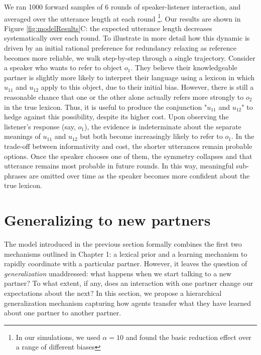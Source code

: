 We ran 1000 forward samples of 6 rounds of speaker-listener interaction, and averaged over the utterance length at each round \footnote{In our simulations, we used $\alpha = 10$ and found the basic reduction effect over a range of different biases}. 
Our results are shown in Figure \ref{fig:modelResults}C: the expected utterance length decreases systematically over each round. 
To illustrate in more detail how this dynamic is driven by an initial rational preference for redundancy relaxing as reference becomes more reliable, we walk step-by-step through a single trajectory. 
Consider a speaker who wants to refer to object $o_1$. 
They believe their knowledgeable partner is slightly more likely to interpret their language using a lexicon in which $u_{11}$ and $u_{12}$ apply to this object, due to their initial bias. 
However, there is still a reasonable chance that one or the other alone actually refers more strongly to $o_2$ in the true lexicon. 
Thus, it is useful to produce the conjunction "$u_{11}$ and $u_{12}$" to hedge against this possibility, despite its higher cost. 
Upon observing the listener's response (say, $o_1$), the evidence is indeterminate about the separate meanings of $u_{11}$ and $u_{12}$ but both become increasingly likely to refer to $o_1$. 
In the trade-off between informativity and cost, the shorter utterances remain probable options. 
Once the speaker chooses one of them, the symmetry collapses and that utterance remains most probable in future rounds. 
In this way, meaningful sub-phrases are omitted over time as the speaker becomes more confident about the true lexicon. 

\section{Generalizing to new partners}

The model introduced in the previous section formally combines the first two mechanisms outlined in Chapter 1: a lexical prior and a learning mechanism to rapidly coordinate with a particular partner.
However, it leaves the question of \emph{generalization} unaddressed: what happens when we start talking to a new partner?
To what extent, if any, does an interaction with one partner change our expectations about the next? 
In this section, we propose a hierarchical generalization mechanism capturing how agents transfer what they have learned about one partner to another partner. 

